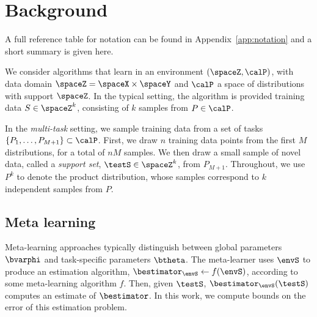 \section{Background}

A full reference table for notation can be found in Appendix~\ref{app:notation} and a short summary is given here.

We consider algorithms that learn in an environment $(\spaceZ, \calP)$, with data domain $\spaceZ = \spaceX \times \spaceY$ and $\calP$ a space of distributions with support $\spaceZ$. In the typical \iid setting, the algorithm is provided training data $S \in \spaceZ^k$, consisting of $k$ \iid samples from $P \in \calP$. 

In the {\it multi-task} setting, we sample training data from a set of tasks $\{P_1,\ldots,P_{M+1}\} \subset \calP$.
First, we draw $n$ training data points from the first $M$ distributions, for a total of $nM$ samples. We then draw a small sample of novel data,
called a {\it support set}, $\testS \in \spaceZ^k$, from $P_{M+1}$. Throughout, we use $P^k$ to denote the product distribution, whose samples correspond to $k$ independent samples from $P$.

\subsection{Meta learning}

Meta-learning approaches %
typically distinguish between global parameters $\bvarphi$ and task-specific parameters $\btheta$. The meta-learner uses $\envS$ to produce an estimation algorithm, $\bestimator_{\envS} \leftarrow f(\envS)$, according to some meta-learning algorithm $f$. Then, given $\testS$, $\bestimator_{\envS}(\testS)$ computes an estimate of $\bestimator$. In this work, we compute bounds on the error of this estimation problem.
 
